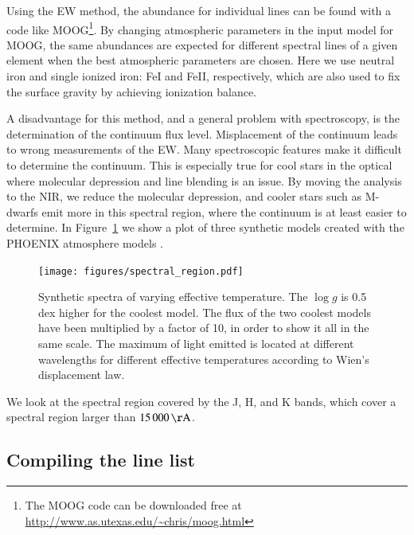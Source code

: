 \documentclass{aa}
\begin{document}
Using the EW method, the abundance for individual lines can be found
with a code like MOOG\footnote{The MOOG code can be downloaded free
at \url{http://www.as.utexas.edu/~chris/moog.html}}. By changing
atmospheric parameters in the input model for MOOG, the same abundances
are expected for different spectral lines of a given element when the
best atmospheric parameters are chosen. Here we use neutral iron and
single ionized iron: FeI and FeII, respectively, which are also used to
fix the surface gravity by achieving ionization balance.

A disadvantage for this method, and a general problem with spectroscopy,
is the determination of the continuum flux level. Misplacement of the
continuum leads to wrong measurements of the EW. Many spectroscopic
features make it difficult to determine the continuum. This is
especially true for cool stars in the optical where molecular depression
and line blending is an issue. By moving the analysis to the NIR, we
reduce the molecular depression, and cooler stars such as M-dwarfs emit
more in this spectral region, where the continuum is at least easier to
determine. In Figure~\ref{fig:spectral_region} we show a plot of three
synthetic models created with the PHOENIX atmosphere models \citep{Husser2013}.

\begin{figure}[tbp!]
    \centering
    \texttt{[image: figures/spectral\_region.pdf]}
    \caption{Synthetic spectra of varying effective temperature. The $\log g$
    is 0.5 dex higher for the coolest model. The flux of the two coolest models
    have been multiplied by a factor of 10, in order to show it all in the same
    scale. The maximum of light emitted is located at different wavelengths for
    different effective temperatures according to Wien's displacement law.}
    \label{fig:spectral_region}
\end{figure}

We look at the spectral region covered by the J, H, and K bands, which cover a
spectral region larger than $\SI{15000}{\AA}$.



\subsection{Compiling the line list}
\end{document}
